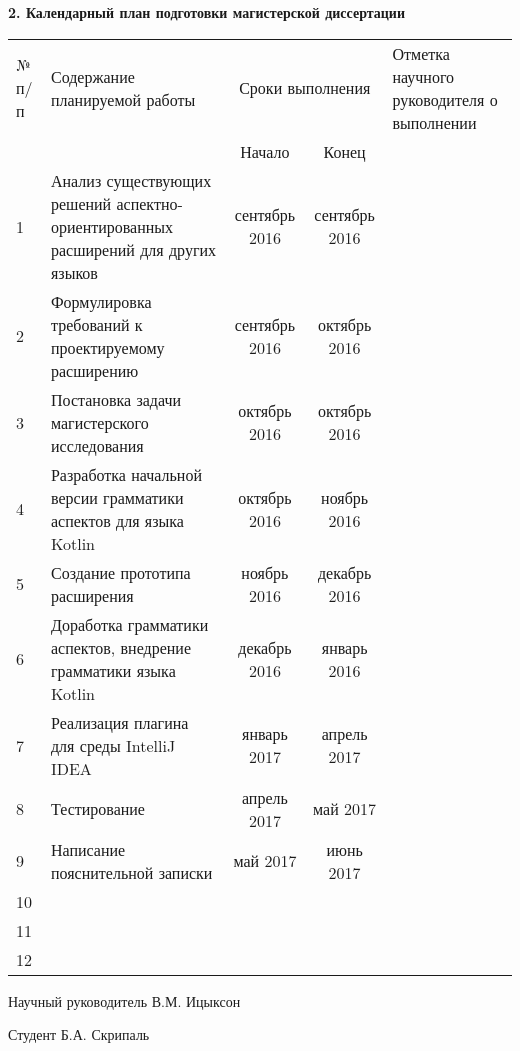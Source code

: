 \begin{center}

\textbf{2. Календарный план подготовки магистерской диссертации}

\vspace{1em}

\begin{tabularx}{\textwidth}{| p{0.5cm} | p{5.5cm} | c | c | p{3cm} |}
\hline
№ п/п & Содержание планируемой работы & \multicolumn{2}{|c|}{Сроки выполнения}
& Отметка \mbox{научного} \mbox{руководителя} о выполнении \\ \cline{3-4}
& & Начало & Конец & \\ \hline
1 & Анализ существующих решений аспектно-ориентированных расширений для других 
языков & сентябрь 2016 & 
сентябрь 2016 & \\ \hline
2 & Формулировка требований к проектируемому расширению & сентябрь 2016 & 
октябрь 2016 & \\ \hline
3 & Постановка задачи магистерского исследования & октябрь 2016 & октябрь 2016 
& \\ \hline
4 & Разработка начальной версии грамматики аспектов для языка Kotlin & октябрь 
2016 & ноябрь 2016 & \\ \hline
5 & Создание прототипа расширения & ноябрь 2016 & декабрь 2016 & \\ \hline
6 & Доработка грамматики аспектов, внедрение грамматики языка Kotlin & декабрь 
2016 & январь 2016 & \\ \hline
7 & Реализация плагина для среды IntelliJ IDEA & январь 2017 & апрель 2017 & \\ 
\hline
8 & Тестирование & апрель 2017 & май 2017 & \\ \hline
9 & Написание пояснительной записки & май 2017 & июнь 2017 & \\ \hline
10 & & & & \\ \hline
11 & & & & \\ \hline
12 & & & & \\ \hline
\end{tabularx}

\end{center}

\vspace{1em}

Научный руководитель \uline{\hfill} В.М. Ицыксон

\vspace{1em}

Студент \uline{\hfill} Б.А. Скрипаль
